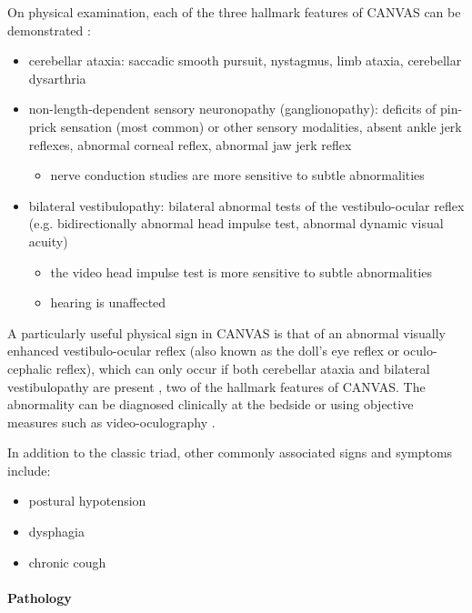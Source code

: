On physical examination, each of the three hallmark features of CANVAS can be demonstrated :

\begin{itemize}
	\item
	cerebellar ataxia: saccadic smooth pursuit, nystagmus, limb ataxia, cerebellar dysarthria
	\item
	non-length-dependent sensory neuronopathy (ganglionopathy): deficits of pin-prick sensation (most common) or other sensory modalities, absent ankle jerk reflexes, abnormal corneal reflex, abnormal jaw jerk reflex
	
	\begin{itemize}
		\item
		nerve conduction studies are more sensitive to subtle abnormalities
	\end{itemize}
	\item
	bilateral vestibulopathy: bilateral abnormal tests of the vestibulo-ocular reflex (e.g. bidirectionally abnormal head impulse test, abnormal dynamic visual acuity)
	
	\begin{itemize}
		\item
		the video head impulse test is more sensitive to subtle abnormalities
		\item
		hearing is unaffected
	\end{itemize}
\end{itemize}

A particularly useful physical sign in CANVAS is that of an abnormal visually enhanced vestibulo-ocular reflex (also known as the doll's eye reflex or oculo-cephalic reflex), which can only occur if both cerebellar ataxia and bilateral vestibulopathy are present , two of the hallmark features of CANVAS. The abnormality can be diagnosed clinically at the bedside or using objective measures such as video-oculography .

In addition to the classic triad, other commonly associated signs and symptoms include:

\begin{itemize}
	\item
	postural hypotension 
	\item
	dysphagia 
	\item
	chronic cough 
\end{itemize}

\paragraph{Pathology}

